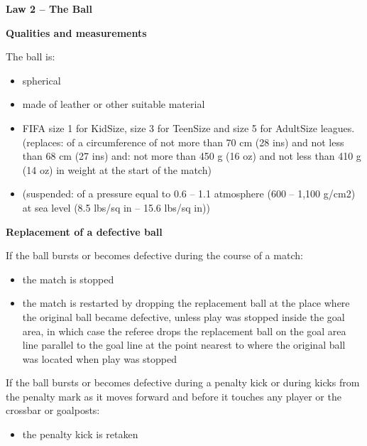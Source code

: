 \clearpage
\sffamily
{\bfseries\color[rgb]{0.4,0.4,0.4}
Law 2 -- The Ball}


\bigskip

{\bfseries Qualities and measurements }

\headlinebox

The ball is:

\begin{itemize}
\item spherical
\item made of leather or other suitable material
\item FIFA size 1 for KidSize, size 3 for TeenSize and size 5 for AdultSize leagues. 
\textcolor[rgb]{0.4,0.4,0.4}{(replaces: of a circumference of not more than 70 cm (28 ins) and not less than 68 cm (27 ins) and: not more than 450 g (16 oz) and not less than 410 g (14 oz) in weight at the start of the match)}
\item {\color[rgb]{0.4,0.4,0.4}
(suspended: of a pressure equal to 0.6 -- 1.1 atmosphere (600 -- 1,100 g/cm2) at sea level (8.5 lbs/sq in -- 15.6 lbs/sq in)) }
\end{itemize}

\bigskip

{\bfseries Replacement of a defective ball }

\headlinebox

If the ball bursts or becomes defective during the course of a match:

\begin{itemize}
\item the match is stopped
\item the match is restarted by dropping the replacement ball at the place where the original ball became defective, unless play was stopped inside the goal area, in which case the referee drops the replacement ball on the goal area line parallel to the goal line at the point
nearest to where the original ball was located when play was stopped
\end{itemize}

If the ball bursts or becomes defective during a penalty kick or during kicks from the penalty mark as it moves forward and before it touches any player or the crossbar or goalposts: 

\begin{itemize}
\item the penalty kick is retaken
\end{itemize}

